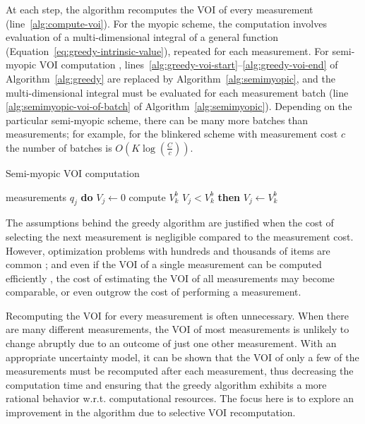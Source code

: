 At each step, the algorithm recomputes the VOI of every
measurement (line~\ref{alg:compute-voi}). For the myopic scheme, the computation
involves evaluation of a multi-dimensional integral of a general
function (Equation~\ref{eq:greedy-intrinsic-value}), repeated for each
measurement. For semi-myopic VOI computation \cite{TolpinShimony.blinkered},
lines~\ref{alg:greedy-voi-start}--\ref{alg:greedy-voi-end} of
Algorithm~\ref{alg:greedy} are replaced by
Algorithm~\ref{alg:semimyopic}, and the multi-dimensional integral
must be evaluated for each measurement batch (line
\ref{alg:semimyopic-voi-of-batch} of
Algorithm~\ref{alg:semimyopic}). Depending on the particular
semi-myopic scheme, there can be many more batches than measurements;
for example, for the blinkered scheme \cite{TolpinShimony.blinkered} with
measurement cost $c$ the number of batches is $O\left(K\log\left(\frac
C c\right)\right)$.
\begin{algorithm}[t]
\caption{Semi-myopic VOI computation}
\label{alg:semimyopic}
\begin{algorithmic}[1]
   {measurements $q_j$} {\bf do} $V_j \leftarrow 0$
      \State compute $V_k^b$                 \label{alg:semimyopic-voi-of-batch}
         {$V_j < V_k^b$} {\bf then}  $V_j \leftarrow V_k^b$
      \EndFor
    \EndIf
  \EndFor
\end{algorithmic}
\end{algorithm}
The assumptions behind the greedy algorithm are justified when the
cost of selecting the next measurement is negligible compared to the
measurement cost. However, optimization problems with hundreds and
thousands of items are common \cite{TolpinShimony.blinkered}; and even
if the VOI of a single measurement can be computed
efficiently \cite{Russell.gametree}, the cost of estimating the VOI
of all measurements may become comparable, or
even outgrow the cost of performing a measurement.

Recomputing the VOI for every measurement is
often unnecessary. When there are many different measurements, the
VOI of most measurements is unlikely to change
abruptly due to an outcome of just one other measurement. With an
appropriate uncertainty model, it can be shown that the VOI
of only a few of the measurements must be recomputed after each
measurement, thus decreasing the computation time and ensuring that
the greedy algorithm exhibits a more rational behavior
w.r.t. computational resources. The focus here is to explore
an improvement in the algorithm due to selective VOI
recomputation.

